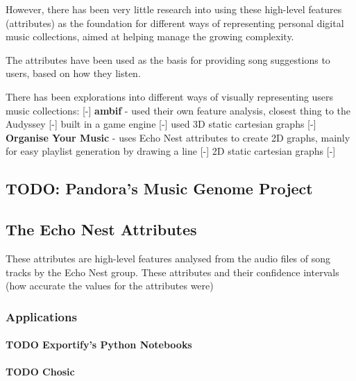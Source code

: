 However, there has been very little research into using these high-level features (attributes) as the foundation for different ways of representing personal digital music collections, aimed at helping manage the growing complexity.

The attributes have been used as the basis for providing song suggestions to users, based on how they listen.

There has been explorations into different ways of visually representing users music collections:
[-] \textbf{ambif} - used their own feature analysis, closest thing to the Audyssey
    [-] built in a game engine
    [-] used 3D static cartesian graphs
[-] \textbf{Organise Your Music} - uses Echo Nest attributes to create 2D graphs, mainly for easy playlist generation by drawing a line
    [-] 2D static cartesian graphs
[-] \textbf{}

\subsection{TODO: Pandora's Music Genome Project}

\subsection{The Echo Nest Attributes}
These attributes are high-level features analysed from the audio files of song tracks by the Echo Nest group. These attributes and their confidence intervals (how accurate the values for the attributes were)



\subsubsection{Applications}

\paragraph{TODO Exportify's Python Notebooks}

\paragraph{TODO Chosic}
